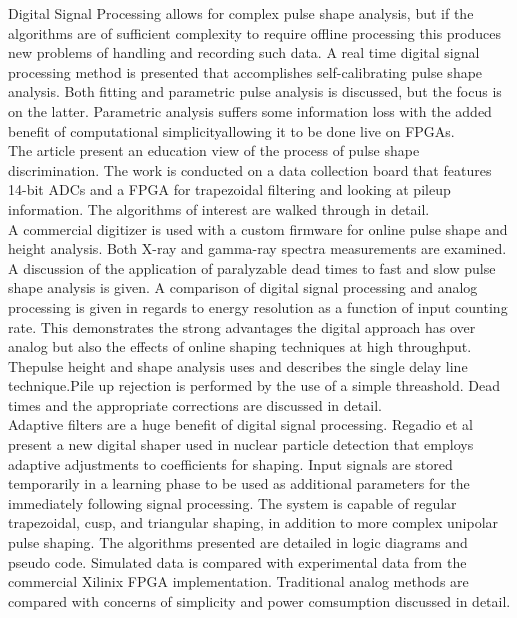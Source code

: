 \documentclass[12pt]{article}
\begin{document}
{\large\textbf{\cite{Suarez2008276}}}
Digital Signal Processing allows for complex pulse shape analysis, but if the algorithms are of sufficient complexity to require offline processing this produces new problems of handling and recording such data. A real time digital signal processing method is presented that accomplishes self-calibrating pulse shape analysis. Both fitting and parametric pulse analysis is discussed, but the focus is on the latter. Parametric analysis suffers some information loss with the added benefit of computational simplicityallowing it to be done live on FPGAs.
\\
The article present an education view of the process of pulse shape discrimination. The work is conducted on a data collection board that features 14-bit ADCs and a FPGA for trapezoidal filtering and looking at pileup information. The algorithms of interest are walked through in detail.
\\[20pt]


{\large\textbf{\cite{Abbene2013124}}}
A commercial digitizer is used with a custom firmware for online pulse shape and height analysis. Both X-ray and gamma-ray spectra measurements are examined. A discussion of the application of paralyzable dead times to fast and slow pulse shape analysis is given. A comparison of digital signal processing and analog processing is given in regards to energy resolution as a function of input counting rate. This demonstrates the strong advantages the digital approach has over analog but also the effects of online shaping techniques at high throughput.
\\
Thepulse height and shape analysis uses and describes the single delay line technique.Pile up rejection is performed by the use of a simple threashold. Dead times and the appropriate corrections are discussed in detail.
\\[20pt]


{\large\textbf{\cite{Regadio2014297}}}
Adaptive filters are a huge benefit of digital signal processing. Regadio et al present a new digital shaper used in nuclear particle detection that employs adaptive adjustments to coefficients for shaping. Input signals are stored temporarily in a learning phase to be used as additional parameters for the immediately following signal processing. The system is capable of regular trapezoidal, cusp, and triangular shaping, in addition to more complex unipolar pulse shaping. The algorithms presented are detailed in logic diagrams and pseudo code. Simulated data is compared with experimental data from the commercial Xilinix FPGA implementation. Traditional analog methods are compared with concerns of simplicity and power comsumption discussed in detail.
\\[20pt]
\end{document}
